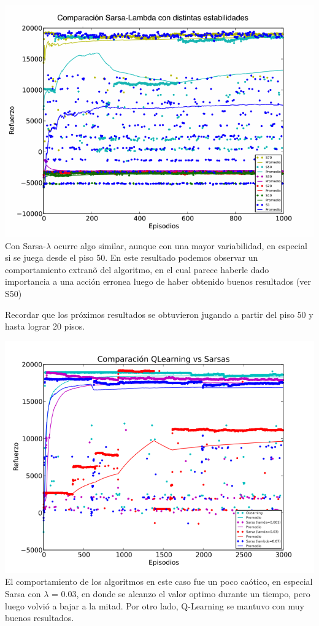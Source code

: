 \documentclass[11pt, a4paper]{article}
\newcommand{\slambda}{Sarsa-$\lambda$ }
\begin{document}
\includegraphics[scale=0.6]{Graficos/estabilidadesS}
Con \slambda ocurre algo similar, aunque con una mayor variabilidad, en especial si se juega desde el piso 50. En este resultado podemos observar un comportamiento extran\~o del algoritmo, en el cual parece haberle dado importancia a una acci\'on erronea luego de haber obtenido buenos resultados (ver S50)

\newpage
Recordar que los pr\'oximos resultados se obtuvieron jugando a partir del piso 50 y hasta lograr 20 pisos.

\includegraphics[scale=0.6]{Graficos/QvsS}
El comportamiento de los algoritmos en este caso fue un poco ca\'otico, en especial Sarsa con $\lambda$ = 0.03, en donde se alcanzo el valor optimo durante un tiempo, pero luego volvi\'o a bajar a la mitad. Por otro lado, Q-Learning se mantuvo con muy buenos resultados. 
\end{document}
